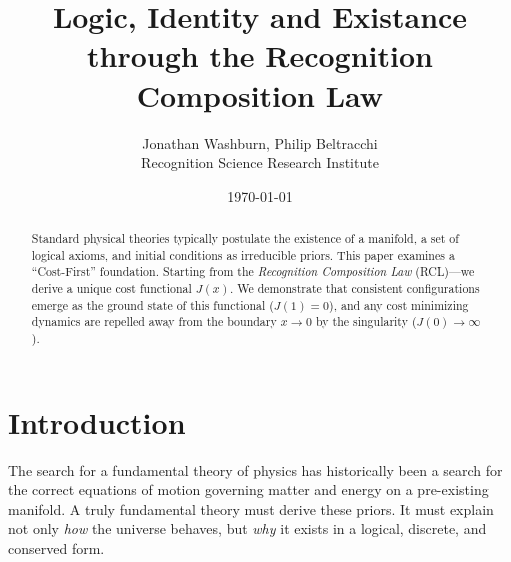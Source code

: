 \documentclass[11pt,a4paper]{article}
\begin{document}
\title{\textbf{Logic, Identity and Existance through the Recognition Composition Law}}
\author{Jonathan Washburn, Philip Beltracchi \\
Recognition Science Research Institute}
\date{\today}
\maketitle
\begin{abstract}

Standard physical theories typically postulate the existence of a manifold, a set of logical axioms, and initial conditions as irreducible priors. This paper examines a ``Cost-First'' foundation. Starting from the \textit{Recognition Composition Law} (RCL)—we derive a unique cost functional $J(x)$. We demonstrate that consistent configurations emerge as the ground state of this functional ($J(1)=0$), and any cost minimizing dynamics are repelled away from the boundary $x\rightarrow 0$  by the singularity ($J(0) \to \infty$).

\end{abstract}

\section{Introduction}

The search for a fundamental theory of physics has historically been a search for the correct equations of motion governing matter and energy on a pre-existing manifold.  A truly fundamental theory must derive these priors. It must explain not only \textit{how} the universe behaves, but \textit{why} it exists in a logical, discrete, and conserved form.
\end{document}
